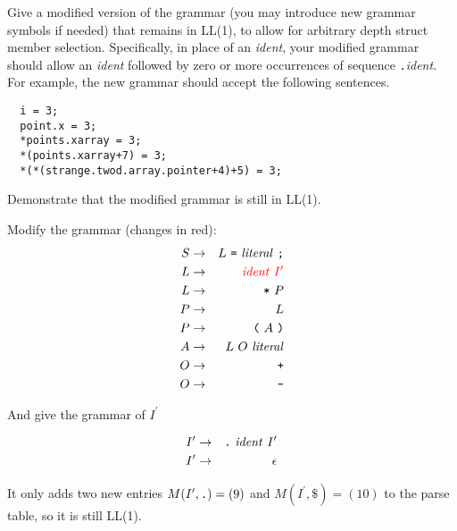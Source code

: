 \documentclass[10pt]{article}
\begin{document}
Give a modified version of the grammar
(you may introduce new grammar symbols if needed)
that remains in LL(1),
to allow for arbitrary depth struct member selection.
Specifically,
in place of an \emph{ident},
your modified grammar should allow
an \emph{ident} followed by zero or more
occurrences of sequence \verb|.|\emph{ident}.
For example, the new grammar should accept
the following sentences.
\begin{verbatim}
  i = 3;
  point.x = 3;
  *points.xarray = 3;
  *(points.xarray+7) = 3;
  *(*(strange.twod.array.pointer+4)+5) = 3;
\end{verbatim}
Demonstrate that the modified grammar is still in LL(1).
\begin{framed}
Modify the grammar (changes in red):
\begin{eqnarray*}
    S & \rightarrow & L ~ \verb|=| ~ \mathit{literal} ~ \verb|;| \\
    L & \rightarrow & \color{red}{\mathit{ident} ~ I^{\prime}}
    \\
    L & \rightarrow & \verb|*| ~ P
    \\
    P & \rightarrow & L
    \\
    P & \rightarrow & \verb|(| ~ A ~ \verb|)|
    \\
    A & \rightarrow & L ~ O ~ \mathit{literal}
    \\
    O & \rightarrow & \verb|+|
    \\
    O & \rightarrow & \verb|-|
\end{eqnarray*}

And give the grammar of $I^{\prime}$

\begin{eqnarray*}
    I^{\prime} & \rightarrow & \verb|.| ~ \mathit{ident} ~ I^{\prime}
    \\
    I^{\prime} & \rightarrow & \epsilon
\end{eqnarray*}

It only adds two new entries  $M(I^\prime, \verb|.|) = (9)$ and $M(I^\prime, \$) = (10)$ to the parse table, so it is still LL(1).
\end{framed}
\end{document}
